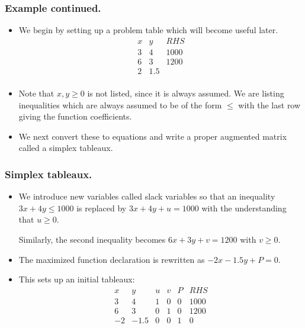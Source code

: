 %

\begin{frame}%
  \frametitle{Example continued.}
  \begin{itemize}%

\item We begin by setting up a problem table which will become useful
later.
$$
\begin{array}{rr|r}
x & y & RHS \\
3 & 4 & 1000\\
6 & 3 & 1200 \\
2 & 1.5 & \\
\end{array}
$$

\item Note that $x,y\ge 0$ is not listed, since it is always assumed.
We are listing inequalities which are always assumed to be of the form
$\le $ with the last row giving the function coefficients.

\item We next convert these to equations and write a proper augmented
matrix called a simplex tableaux.

\end{itemize}
\end{frame}

\begin{frame}%
  \frametitle{Simplex tableaux.}
  \begin{itemize}%
\item We introduce new variables called slack variables so that an
inequality $3x+4y\le 1000$ is replaced by $3x+4y+u=1000$ with the
understanding that $u\ge 0$.

Similarly, the second inequality becomes $6x+3y+v=1200$ with $v\ge 0$.


\item The maximized function declaration  is rewritten as
$-2x-1.5y+P=0$.

\item This sets up an initial tableaux:
$$
\begin{array}{rrrrr|r}
x & y & u & v & P & RHS\\\hline
3 & 4 & 1 & 0 & 0 & 1000\\
6 & 3 & 0 & 1 & 0 & 1200 \\\hline
-2 & -1.5 & 0 & 0 & 1 & 0\\
\end{array}
$$



\end{itemize}

\end{frame}

